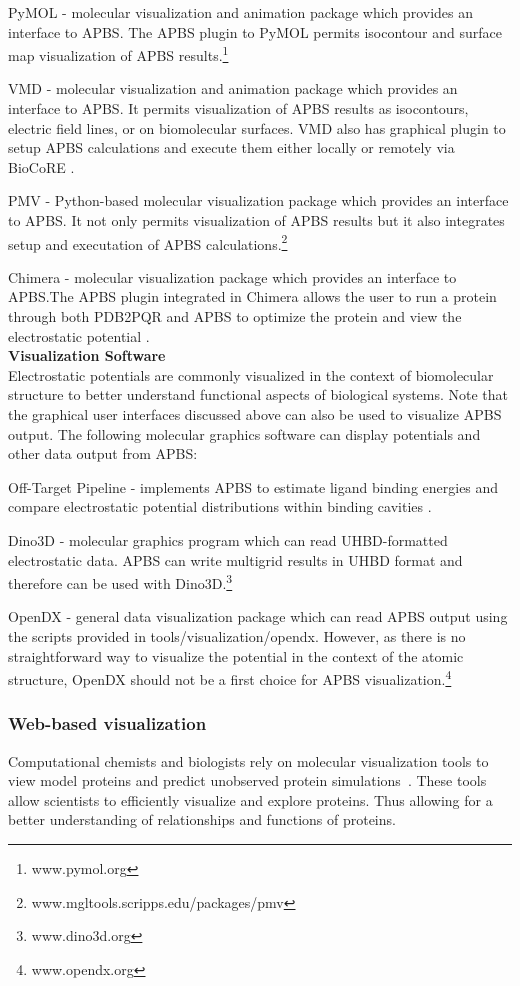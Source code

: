 \documentclass[11pt,titlepage]{article}
\begin{document}
PyMOL - molecular visualization and animation package which provides an interface to APBS. The APBS plugin to PyMOL permits isocontour and surface map visualization of APBS results.\footnote{www.pymol.org}

VMD - molecular visualization and animation package which provides an interface to APBS. It permits visualization of APBS results as isocontours, electric field lines, or on biomolecular surfaces. VMD also has graphical plugin to setup APBS calculations and execute them either locally or remotely via BioCoRE \cite{humphrey1996}. 

PMV - Python-based molecular visualization package which provides an interface to APBS. It not only permits visualization of APBS results but it also integrates setup and executation of APBS calculations.\footnote{www.mgltools.scripps.edu/packages/pmv}

Chimera - molecular visualization package which provides an interface to APBS.The APBS plugin integrated in Chimera allows the user to run a protein through both PDB2PQR and APBS to optimize the protein and view the electrostatic potential \cite{pettersen2004}. \\
%
\textbf{Visualization Software} \\
Electrostatic potentials are commonly visualized in the context of biomolecular structure to better understand functional aspects of biological systems. Note that the graphical user interfaces discussed above can also be used to visualize APBS output. The following molecular graphics software can display potentials and other data output from APBS:

Off-Target Pipeline - implements APBS to estimate ligand binding energies and compare electrostatic potential distributions within binding cavities \cite{evangelidis2012}.

Dino3D - molecular graphics program which can read UHBD-formatted electrostatic data. APBS can write multigrid results in UHBD format and therefore can be used with Dino3D.\footnote{www.dino3d.org}

OpenDX - general data visualization package which can read APBS output using the scripts provided in tools/visualization/opendx. However, as there is no straightforward way to visualize the potential in the context of the atomic structure, OpenDX should not be a first choice for APBS visualization.\footnote{www.opendx.org}

\subsubsection{Web-based visualization}
Computational chemists and biologists rely on molecular visualization tools to view model proteins and predict unobserved protein simulations~\cite{Jones2005}. These tools allow scientists to efficiently visualize and explore proteins. Thus allowing for a better understanding of relationships and functions of proteins.  
\end{document}
